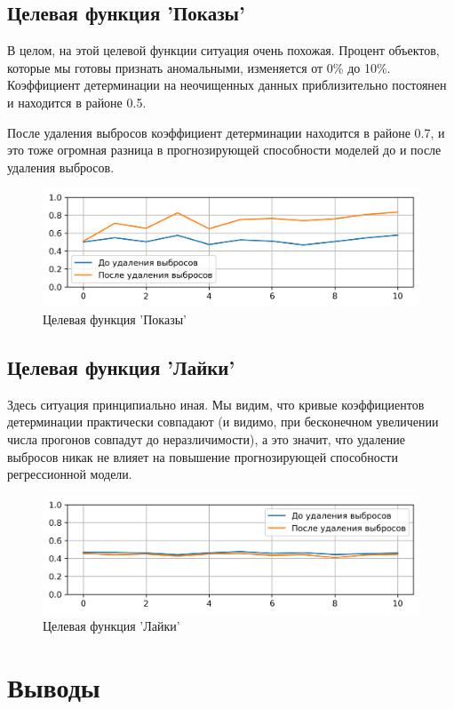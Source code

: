 \documentclass[a4paper,12pt]{article}
\begin{document}
\subsection{Целевая функция 'Показы'}

В целом, на этой целевой функции ситуация очень похожая. Процент объектов, которые мы готовы признать аномальными, изменяется от 0\% до 10\%. Коэффициент детерминации на неочищенных данных приблизительно постоянен и находится в районе 0.5. 

После удаления выбросов коэффициент детерминации находится в районе 0.7, и это тоже огромная разница в прогнозирующей способности моделей до и после удаления выбросов.

\begin{figure}[!h]
	\centering
	\includegraphics[width=0.8\linewidth]{pictures/Показы}
	\caption{Целевая функция 'Показы'}
\end{figure}


\subsection{Целевая функция 'Лайки'}

Здесь ситуация принципиально иная. Мы видим, что кривые коэффициентов детерминации практически совпадают (и видимо, при бесконечном увеличении числа прогонов совпадут до неразличимости), а это значит, что удаление выбросов никак не влияет на повышение прогнозирующей способности регрессионной модели.

\begin{figure}[!h]
	\centering
	\includegraphics[width=0.8\linewidth]{pictures/Лайки}
	\caption{Целевая функция 'Лайки'}
\end{figure}

\section{Выводы}
\end{document}
